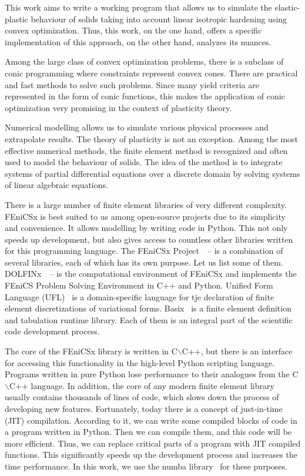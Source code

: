 \documentclass[12pt]{article}
\begin{document}
This work aims to write a working program that allows us to simulate the elastic-plastic behaviour of solids taking into account linear isotropic hardening using convex optimization. Thus, this work, on the one hand, offers a specific implementation of this approach, on the other hand, analyzes its nuances.

Among the large class of convex optimization problems, there is a subclass of conic programming where constraints represent convex cones. There are practical and fast methods to solve such problems. Since many yield criteria are represented in the form of conic functions, this makes the application of conic optimization very promising in the context of plasticity theory.

Numerical modelling allows us to simulate various physical processes and extrapolate results. The theory of plasticity is not an exception. Among the most effective numerical methods, the finite element method is recognized and often used to model the behaviour of solids. The idea of the method is to integrate systems of partial differential equations over a discrete domain by solving systems of linear algebraic equations. 

There is a large number of finite element libraries of very different complexity. FEniCSx is best suited to us among open-source projects due to its simplicity and convenience. It allows modelling by writing code in Python. This not only speeds up development, but also gives access to countless other libraries written for this programming language. The FEniCSx Project~\parencite{FEniCS2015}~--\parencite{LoggEtal2012} is a combination of several libraries, each of which has its own purpose. Let us list some of them. DOLFINx~\parencite{LoggWells2010}~--\parencite{LoggEtal_10_2012} is the computational environment of FEniCSx and implements the FEniCS Problem Solving Environment in C++ and Python. Unified Form Language (UFL)~\parencite{UFL2014} is a domain-specific language for tje declaration of finite element discretizations of variational forms. Basix~\parencite{BasixJoss} is a finite element definition and tabulation runtime library. Each of them is an integral part of the scientific code development process.

The core of the FEniCSx library is written in C$\backslash$C++, but there is an interface for accessing this functionality in the high-level Python scripting language. Programs written in pure Python lose performance to their analogues from the C$\backslash$C++ language. In addition, the core of any modern finite element library usually contains thousands of lines of code, which slows down the process of developing new features. Fortunately, today there is a concept of just-in-time (JIT) compilation. According to it, we can write some compiled blocks of code in a program written in Python. Then we can compile them, and this code will be more efficient. Thus, we can replace critical parts of a program with JIT compiled functions. This significantly speeds up the development process and increases the time performance. In this work, we use the numba library~\parencite{Numba2015} for these purposes. 
\end{document}
